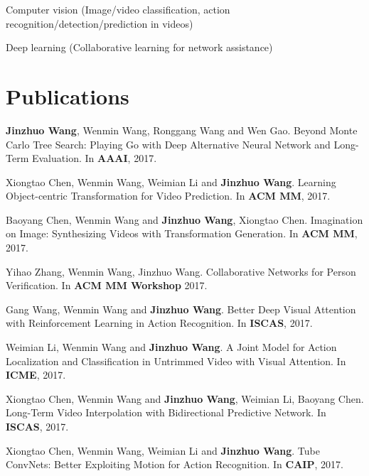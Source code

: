 \documentclass[letterpaper]{article}
\renewenvironment{itemize}{
  \begin{list}{}{
    \setlength{\leftmargin}{1.5em}
  }
}{
  \end{list}
}
\begin{document}
\begin{itemize}
    \item Computer vision (Image/video classification, action recognition/detection/prediction in videos)
    \item Deep learning (Collaborative learning for network assistance)
\end{itemize}

\section*{Publications}

\begin{itemize}

\item[1.] \textbf{Jinzhuo Wang}, Wenmin Wang, Ronggang Wang and Wen Gao. Beyond Monte Carlo Tree Search: Playing Go with Deep Alternative Neural Network and Long-Term Evaluation. In \textbf{AAAI}, 2017.

\item[2.] Xiongtao Chen, Wenmin Wang, Weimian Li and \textbf{Jinzhuo Wang}. Learning Object-centric Transformation for Video Prediction. In \textbf{ACM MM}, 2017.

\item[3.] Baoyang Chen, Wenmin Wang and \textbf{Jinzhuo Wang}, Xiongtao Chen. Imagination on Image: Synthesizing Videos with Transformation Generation. In \textbf{ACM MM}, 2017.

\item[4.] Yihao Zhang, Wenmin Wang, Jinzhuo Wang. Collaborative Networks for Person Verification. In \textbf{ACM MM Workshop} 2017.

\item[5.] Gang Wang, Wenmin Wang and \textbf{Jinzhuo Wang}. Better Deep Visual Attention with Reinforcement Learning in Action Recognition. In \textbf{ISCAS}, 2017.

\item[6.] Weimian Li, Wenmin Wang and \textbf{Jinzhuo Wang}. A Joint Model for Action Localization and Classification in Untrimmed Video with Visual Attention. In \textbf{ICME}, 2017.

\item[7.] Xiongtao Chen, Wenmin Wang and \textbf{Jinzhuo Wang}, Weimian Li, Baoyang Chen. Long-Term Video Interpolation with Bidirectional Predictive Network. In \textbf{ISCAS}, 2017.


\item[8.] Xiongtao Chen, Wenmin Wang, Weimian Li and \textbf{Jinzhuo Wang}. Tube ConvNets: Better Exploiting Motion for Action Recognition. In \textbf{CAIP}, 2017.


\end{itemize}
\end{document}
